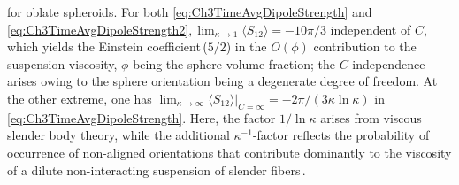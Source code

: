 \documentclass{jfm}
\begin{document}
for oblate spheroids. For both \eqref{eq:Ch3TimeAvgDipoleStrength} and \eqref{eq:Ch3TimeAvgDipoleStrength2}$, \lim_{\kappa \rightarrow 1} \langle S_{12}\rangle =-10\pi/3$ independent of $C$, which yields the Einstein coefficient\,($5/2$) in the $O(\phi)$ contribution to the suspension viscosity, $\phi$ being the sphere volume fraction; the $C$-independence arises owing to the sphere orientation being a degenerate degree of freedom. At the other extreme, one has $\lim_{\kappa \to \infty} \langle S_{12}\rangle|_{C=\infty}=-2\pi/(3\kappa\ln\kappa)$ in \eqref{eq:Ch3TimeAvgDipoleStrength}. Here, the factor $1/\ln\kappa$ arises from viscous slender body theory\citep{subkoch2005}, while the additional $\kappa^{-1}$-factor reflects the probability of occurrence of non-aligned orientations that contribute dominantly to the viscosity of a dilute non-interacting suspension of slender fibers\,\citep{leal1971,navaneeth2016}.
\end{document}
